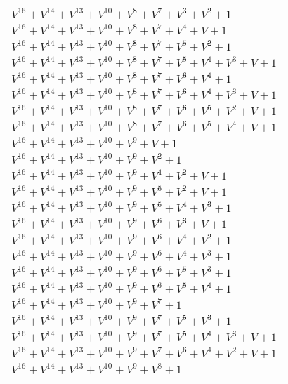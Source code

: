 \documentclass[12pt]{article}
\begin{document}
\begin{adjustwidth}{-4cm}{}
\begin{center}
\begin{longtable}{|l|}
$V^{16}  +V^{14}  +V^{13}  +V^{10}  +V^{8}  +V^{7}  +V^{3}  +V^{2}  + 1$ \\
$V^{16}  +V^{14}  +V^{13}  +V^{10}  +V^{8}  +V^{7}  +V^{4}  + V + 1$ \\
$V^{16}  +V^{14}  +V^{13}  +V^{10}  +V^{8}  +V^{7}  +V^{5}  +V^{2}  + 1$ \\
$V^{16}  +V^{14}  +V^{13}  +V^{10}  +V^{8}  +V^{7}  +V^{5}  +V^{4}  +V^{3}  + V + 1$ \\
$V^{16}  +V^{14}  +V^{13}  +V^{10}  +V^{8}  +V^{7}  +V^{6}  +V^{4}  + 1$ \\
$V^{16}  +V^{14}  +V^{13}  +V^{10}  +V^{8}  +V^{7}  +V^{6}  +V^{4}  +V^{3}  + V + 1$ \\
$V^{16}  +V^{14}  +V^{13}  +V^{10}  +V^{8}  +V^{7}  +V^{6}  +V^{5}  +V^{2}  + V + 1$ \\
$V^{16}  +V^{14}  +V^{13}  +V^{10}  +V^{8}  +V^{7}  +V^{6}  +V^{5}  +V^{4}  + V + 1$ \\
$V^{16}  +V^{14}  +V^{13}  +V^{10}  +V^{9}  + V + 1$ \\
$V^{16}  +V^{14}  +V^{13}  +V^{10}  +V^{9}  +V^{2}  + 1$ \\
$V^{16}  +V^{14}  +V^{13}  +V^{10}  +V^{9}  +V^{4}  +V^{2}  + V + 1$ \\
$V^{16}  +V^{14}  +V^{13}  +V^{10}  +V^{9}  +V^{5}  +V^{2}  + V + 1$ \\
$V^{16}  +V^{14}  +V^{13}  +V^{10}  +V^{9}  +V^{5}  +V^{4}  +V^{3}  + 1$ \\
$V^{16}  +V^{14}  +V^{13}  +V^{10}  +V^{9}  +V^{6}  +V^{3}  + V + 1$ \\
$V^{16}  +V^{14}  +V^{13}  +V^{10}  +V^{9}  +V^{6}  +V^{4}  +V^{2}  + 1$ \\
$V^{16}  +V^{14}  +V^{13}  +V^{10}  +V^{9}  +V^{6}  +V^{4}  +V^{3}  + 1$ \\
$V^{16}  +V^{14}  +V^{13}  +V^{10}  +V^{9}  +V^{6}  +V^{5}  +V^{3}  + 1$ \\
$V^{16}  +V^{14}  +V^{13}  +V^{10}  +V^{9}  +V^{6}  +V^{5}  +V^{4}  + 1$ \\
$V^{16}  +V^{14}  +V^{13}  +V^{10}  +V^{9}  +V^{7}  + 1$ \\
$V^{16}  +V^{14}  +V^{13}  +V^{10}  +V^{9}  +V^{7}  +V^{5}  +V^{3}  + 1$ \\
$V^{16}  +V^{14}  +V^{13}  +V^{10}  +V^{9}  +V^{7}  +V^{5}  +V^{4}  +V^{3}  + V + 1$ \\
$V^{16}  +V^{14}  +V^{13}  +V^{10}  +V^{9}  +V^{7}  +V^{6}  +V^{4}  +V^{2}  + V + 1$ \\
$V^{16}  +V^{14}  +V^{13}  +V^{10}  +V^{9}  +V^{8}  + 1$ \\

\end{longtable}
\end{center}
\end{adjustwidth}
\end{document}
